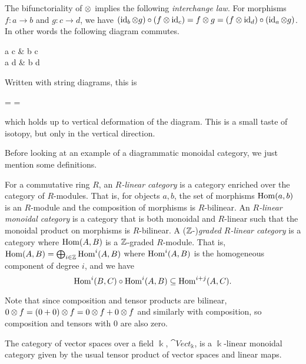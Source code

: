 The bifunctoriality of $\otimes$ implies the following \textit{interchange law}. For morphisms $f: a \to b$ and $g: c \to d$, we have $(\operatorname{id}_b \otimes g) \circ (f \otimes \operatorname{id}_c) = f \otimes g = (f \otimes \operatorname{id}_d) \circ (\operatorname{id}_a \otimes g)$. In other words the following diagram commutes.

\begin{center}
    \begin{mytikzcd}[sep=large]
        a \tensor c \arrow[r,"f \tensor \id_c"] \arrow[d, "\id_a \tensor g"'] \arrow[dr, "f \tensor g"]
        & b \tensor c \arrow[d, "\id_b \tensor g"] \\
        a \tensor d \arrow[r,"f \tensor \id_d"]
        & b \tensor d
    \end{mytikzcd}
\end{center}
Written with string diagrams, this is
\begin{center}
    = 
    = 
\end{center}
which holds up to vertical deformation of the diagram. This is a small taste of isotopy, but only in the vertical direction.

Before looking at an example of a diagrammatic monoidal category, we just mention some definitions.

\begin{definition}
    For a commutative ring $R$, an \textit{$R$-linear category} is a category enriched over the category of $R$-modules. That is, for objects $a,b$, the set of morphisms $\operatorname{Hom}(a,b)$ is an $R$-module and the composition of morphisms is $R$-bilinear. An \textit{$R$-linear monoidal category} is a category that is both monoidal and $R$-linear such that the monoidal product on morphisms is $R$-bilinear. A ($\mathbb{Z}$-)\textit{graded $R$-linear category} is a category where $\operatorname{Hom}(A,B)$ is a $\mathbb{Z}$-graded $R$-module. That is, $\operatorname{Hom}(A,B) = \bigoplus_{i \in \mathbb{Z}} \operatorname{Hom}^i(A,B)$ where $\operatorname{Hom}^i(A,B)$ is the homogeneous component of degree $i$, and we have \[\operatorname{Hom}^i(B,C) \circ \operatorname{Hom}^i(A,B) \subseteq \operatorname{Hom}^{i+j}(A,C).\]
\end{definition}

Note that since composition and tensor products are bilinear, $0 \otimes f = (0 + 0) \otimes f = 0 \otimes f + 0 \otimes f$ and similarly with composition, so composition and tensors with $0$ are also zero.

\begin{example}
    The category of vector spaces over a field $\Bbbk$, $\cat{Vect}_\Bbbk$, is a $\Bbbk$-linear monoidal category given by the usual tensor product of vector spaces and linear maps.
\end{example}

